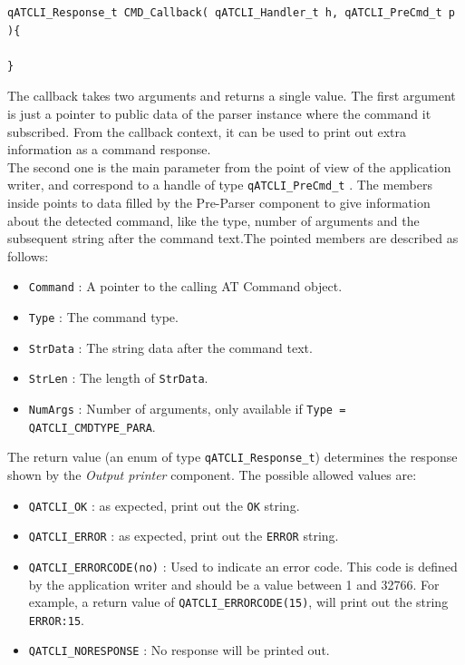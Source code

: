 \documentclass{article}
\begin{document}
\begin{lstlisting}[style=CStyle]
qATCLI_Response_t CMD_Callback( qATCLI_Handler_t h, qATCLI_PreCmd_t p ){
    
}
\end{lstlisting}

The callback takes two arguments and returns a single value. The first argument is just a pointer to public data of the parser instance where the command it subscribed. From the callback context, it can be used to print out extra information as a command response. \\

The second one is the main parameter from the point of view of the application writer, and correspond to a handle of type \lstinline{qATCLI_PreCmd_t} . The members inside points to data filled by the Pre-Parser component to give information about the detected command, like the type, number of arguments and the subsequent string after the command text.The pointed members are described as follows:

\begin{itemize}
    \item \lstinline{Command} : A pointer to the calling AT Command object.
    \item \lstinline{Type} : The command type.
    \item \lstinline{StrData} : The string data after the command text.
    \item \lstinline{StrLen} : The length of \lstinline{StrData}.
    \item \lstinline{NumArgs} : Number of arguments, only available if \lstinline{Type = QATCLI_CMDTYPE_PARA}.
\end{itemize}

The return value (an enum of type \lstinline{qATCLI_Response_t})  determines the response shown by the \textit{Output printer} component. The possible allowed values are:

\begin{itemize}
    \item \lstinline{QATCLI_OK} : as expected, print out the \lstinline{OK} string.
    \item \lstinline{QATCLI_ERROR} : as expected, print out the \lstinline{ERROR} string.
    \item \lstinline{QATCLI_ERRORCODE(no)} : Used to indicate an error code. This code is defined by the application writer and should be a value between 1 and 32766. For example, a return value of \lstinline{QATCLI_ERRORCODE(15)}, will print out the string \lstinline{ERROR:15}.
    \item \lstinline{QATCLI_NORESPONSE} : No response will be printed out.
\end{itemize}
\end{document}
